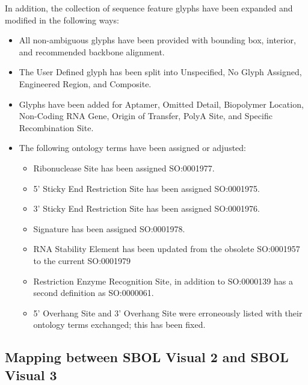 In addition, the collection of sequence feature glyphs have been expanded and modified in the following ways:
\begin{itemize}
\item All non-ambiguous glyphs have been provided with bounding box, interior, and recommended backbone alignment.
\item The User Defined glyph has been split into Unspecified, No Glyph Assigned, Engineered Region, and Composite. 
\item Glyphs have been added for Aptamer, Omitted Detail, Biopolymer Location, Non-Coding RNA Gene, Origin of Transfer, PolyA Site, and Specific Recombination Site.
\item The following ontology terms have been assigned or adjusted: 
	\begin{itemize}
	\item Ribonuclease Site has been assigned SO:0001977.
	\item 5' Sticky End Restriction Site has been assigned SO:0001975.
	\item 3' Sticky End Restriction Site has been assigned SO:0001976.
	\item Signature has been assigned SO:0001978.
	\item RNA Stability Element has been updated from the obsolete SO:0001957 to the current SO:0001979
	\item Restriction Enzyme Recognition Site, in addition to SO:0000139 has a second definition as SO:0000061.
	\item 5' Overhang Site and 3' Overhang Site were erroneously listed with their ontology terms exchanged; this has been fixed.
	\end{itemize}
\end{itemize}

\subsection{Mapping between SBOL Visual 2 and SBOL Visual 3}\label{sec:sbol2}

